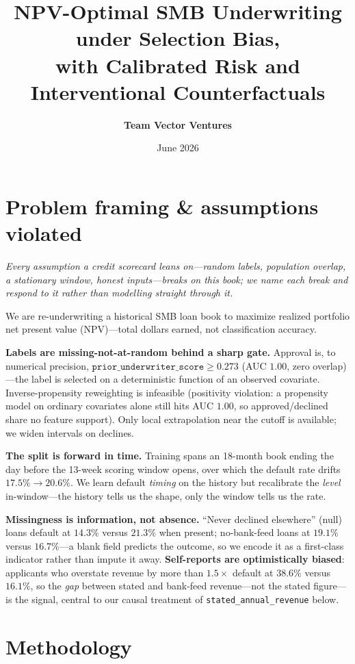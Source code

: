\documentclass[11pt]{article}
\title{\vspace{-1.5em}NPV-Optimal SMB Underwriting under Selection Bias,\\
with Calibrated Risk and Interventional Counterfactuals}
\author{\textbf{Team Vector Ventures}}
\date{June 2026}
\newcommand{\code}[1]{\texttt{#1}}
\begin{document}
\maketitle
\vspace{-1.5em}

\section{Problem framing \& assumptions violated}

\emph{Every assumption a credit scorecard leans on---random labels, population
overlap, a stationary window, honest inputs---breaks on this book; we name each break
and respond to it rather than modelling straight through it.}

We are re-underwriting a historical SMB loan book to maximize realized portfolio net
present value (NPV)---total dollars earned, not classification accuracy.

\textbf{Labels are missing-not-at-random behind a sharp gate.} Approval is, to numerical
precision, $\code{prior\_underwriter\_score} \geq 0.273$ (AUC $1.00$, zero overlap)---the
label is selected on a deterministic function of an observed covariate. Inverse-propensity
reweighting is infeasible (positivity violation: a propensity model on ordinary covariates
alone still hits AUC $1.00$, so approved/declined share no feature support). Only local
extrapolation near the cutoff is available; we widen intervals on declines.

\textbf{The split is forward in time.} Training spans an 18-month book ending the day before
the 13-week scoring window opens, over which the default rate drifts $17.5\% \to 20.6\%$. We
learn default \emph{timing} on the history but recalibrate the \emph{level} in-window---the
history tells us the shape, only the window tells us the rate.

\textbf{Missingness is information, not absence.} ``Never declined elsewhere'' (null) loans
default at $14.3\%$ versus $21.3\%$ when present; no-bank-feed loans at $19.1\%$ versus
$16.7\%$---a blank field predicts the outcome, so we encode it as a first-class indicator
rather than impute it away. \textbf{Self-reports are optimistically biased}: applicants who
overstate revenue by more than $1.5\times$ default at $38.6\%$ versus $16.1\%$, so the
\emph{gap} between stated and bank-feed revenue---not the stated figure---is the signal,
central to our causal treatment of \code{stated\_annual\_revenue} below.

\section{Methodology}
\end{document}
